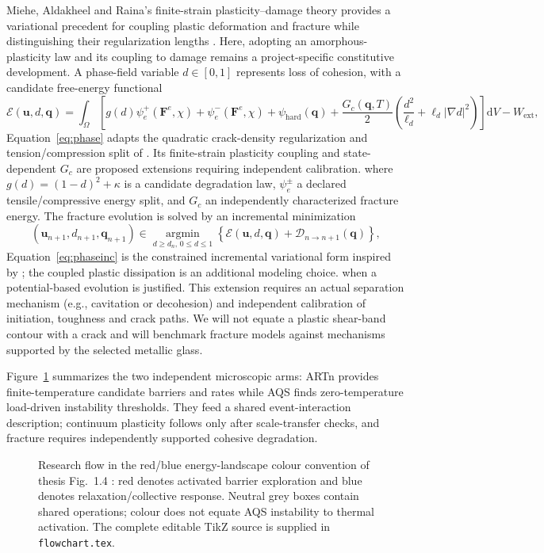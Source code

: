 \documentclass[11pt,a4paper]{article}
\newcommand{\dd}{\mathrm{d}}\newcommand{\avg}[1]{\left\langle #1\right\rangle}\newcommand{\Grad}{\operatorname{Grad}}
\begin{document}
Miehe, Aldakheel and Raina's finite-strain plasticity--damage theory provides a variational precedent for coupling plastic deformation and fracture while distinguishing their regularization lengths \cite{mieheductile2016}. Here, adopting an amorphous-plasticity law and its coupling to damage remains a project-specific constitutive development. A phase-field variable $d\in[0,1]$ represents loss of cohesion, with a candidate free-energy functional
\begin{equation}
 \mathcal E(\mathbf u,d,\mathbf q)=\int_\Omega\!
 \left[g(d)\psi_e^+(\mathbf F^e,\chi)+\psi_e^-(\mathbf F^e,\chi)
 +\psi_{\mathrm{hard}}(\mathbf q)
 +\frac{G_c(\mathbf q,T)}{2}\left(\frac{d^2}{\ell_d}+\ell_d|\nabla d|^2\right)\right]\dd V
 -W_{\mathrm{ext}},\label{eq:phase}
\end{equation}
Equation~\eqref{eq:phase} adapts the quadratic crack-density regularization and tension/compression split of \cite{miehe2010}. Its finite-strain plasticity coupling and state-dependent $G_c$ are proposed extensions requiring independent calibration.
where $g(d)=(1-d)^2+\kappa$ is a candidate degradation law, $\psi_e^\pm$ a declared tensile/compressive energy split, and $G_c$ an independently characterized fracture energy. The fracture evolution is solved by an incremental minimization
\begin{equation}
 (\mathbf u_{n+1},d_{n+1},\mathbf q_{n+1})
 \in\operatorname*{argmin}_{d\ge d_n,\,0\le d\le1}
 \left\{\mathcal E(\mathbf u,d,\mathbf q)+\mathcal D_{n\to n+1}(\mathbf q)\right\},\label{eq:phaseinc}
\end{equation}
Equation~\eqref{eq:phaseinc} is the constrained incremental variational form inspired by \cite{miehe2010,miehe2002a}; the coupled plastic dissipation is an additional modeling choice.
when a potential-based evolution is justified. This extension requires an actual separation mechanism (e.g., cavitation or decohesion) and independent calibration of initiation, toughness and crack paths. We will not equate a plastic shear-band contour with a crack and will benchmark fracture models against mechanisms supported by the selected metallic glass.

Figure~\ref{fig:flow} summarizes the two independent microscopic arms: ARTn provides finite-temperature candidate barriers and rates while AQS finds zero-temperature load-driven instability thresholds. They feed a shared event-interaction description; continuum plasticity follows only after scale-transfer checks, and fracture requires independently supported cohesive degradation.
\begin{figure}[p]\centering

\caption{Research flow in the red/blue energy-landscape colour convention of thesis Fig.~1.4 \cite{swaythesis}: red denotes activated barrier exploration and blue denotes relaxation/collective response. Neutral grey boxes contain shared operations; colour does not equate AQS instability to thermal activation. The complete editable TikZ source is supplied in \texttt{flowchart.tex}.}\label{fig:flow}
\end{figure}
\clearpage
\end{document}
